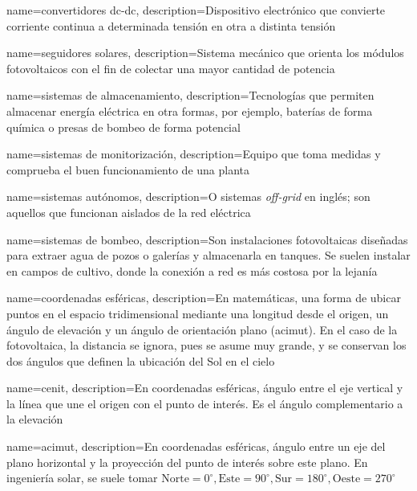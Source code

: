 {
    name={convertidores dc-dc},
    description={Dispositivo electrónico que convierte corriente continua a determinada tensión en otra a distinta tensión}
}

{
    name={seguidores solares},
    description={Sistema mecánico que orienta los módulos fotovoltaicos con el fin de colectar una mayor cantidad de potencia}
}

{
    name={sistemas de almacenamiento},
    description={Tecnologías que permiten almacenar energía eléctrica en otra formas, por ejemplo, baterías de forma química o presas de bombeo de forma potencial}
}

{
    name={sistemas de monitorización},
    description={Equipo que toma medidas y comprueba el buen funcionamiento de una planta}
}

{
    name={sistemas autónomos},
    description={O sistemas \textit{off-grid} en inglés; son aquellos que funcionan aislados de la red eléctrica}
}

{
    name={sistemas de bombeo},
    description={Son instalaciones fotovoltaicas diseñadas para extraer agua de pozos o galerías y almacenarla en tanques. Se suelen instalar en campos de cultivo, donde la conexión a red es más costosa por la lejanía}
}

{
    name={coordenadas esféricas},
    description={En matemáticas, una forma de ubicar puntos en el espacio tridimensional mediante una longitud desde el origen, un \gls{ángulo de elevación} y un ángulo de orientación plano (\gls{acimut}). En el caso de la fotovoltaica, la distancia se ignora, pues se asume muy grande, y se conservan los dos ángulos que definen la ubicación del Sol en el cielo}
}

{
    name={cenit},
    description={En \gls{coordenadas esféricas}, ángulo entre el eje vertical y la línea que une el origen con el punto de interés. Es el ángulo complementario a la elevación}
}

{
    name={acimut},
    description={En \gls{coordenadas esféricas}, ángulo entre un eje del plano horizontal y la proyección del punto de interés sobre este plano. En ingeniería solar, se suele tomar $\text{Norte}=0^\circ, \text{Este}=90^\circ, \text{Sur}=180^\circ, \text{Oeste}=270^\circ$}
}

